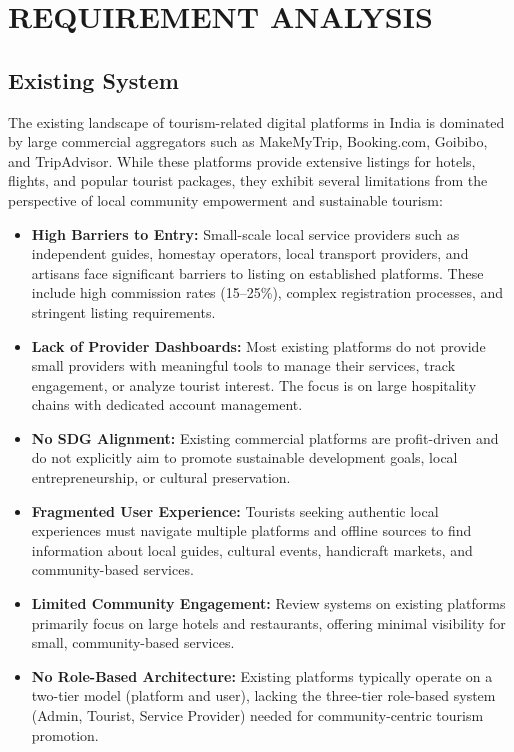 \chapter{REQUIREMENT ANALYSIS}

\section{Existing System}

The existing landscape of tourism-related digital platforms in India is dominated by large commercial aggregators such as MakeMyTrip, Booking.com, Goibibo, and TripAdvisor. While these platforms provide extensive listings for hotels, flights, and popular tourist packages, they exhibit several limitations from the perspective of local community empowerment and sustainable tourism:

\begin{itemize}[leftmargin=2em]
    \item \textbf{High Barriers to Entry:} Small-scale local service providers such as independent guides, homestay operators, local transport providers, and artisans face significant barriers to listing on established platforms. These include high commission rates (15--25\%), complex registration processes, and stringent listing requirements.
    \item \textbf{Lack of Provider Dashboards:} Most existing platforms do not provide small providers with meaningful tools to manage their services, track engagement, or analyze tourist interest. The focus is on large hospitality chains with dedicated account management.
    \item \textbf{No SDG Alignment:} Existing commercial platforms are profit-driven and do not explicitly aim to promote sustainable development goals, local entrepreneurship, or cultural preservation.
    \item \textbf{Fragmented User Experience:} Tourists seeking authentic local experiences must navigate multiple platforms and offline sources to find information about local guides, cultural events, handicraft markets, and community-based services.
    \item \textbf{Limited Community Engagement:} Review systems on existing platforms primarily focus on large hotels and restaurants, offering minimal visibility for small, community-based services.
    \item \textbf{No Role-Based Architecture:} Existing platforms typically operate on a two-tier model (platform and user), lacking the three-tier role-based system (Admin, Tourist, Service Provider) needed for community-centric tourism promotion.
\end{itemize}

